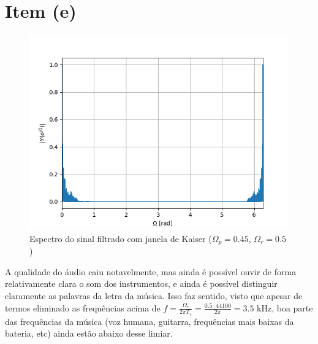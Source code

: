 \documentclass{article}
\begin{document}
\section*{Item (e)}
\FloatBarrier
\begin{figure}[!ht]
    \centering
    \includegraphics[width=\linewidth]{images/filtered_spectrum.png}
    \caption{Espectro do sinal filtrado com janela de Kaiser ($\Omega_p = 0.45$, $\Omega_r = 0.5$)}
\end{figure}

A qualidade do áudio caiu notavelmente, mas ainda é possível ouvir de forma relativamente clara o som dos instrumentos, e ainda é possível distinguir claramente as palavras da letra da música.
Isso faz sentido, visto que apesar de termos eliminado as frequências acima de $f = \frac{\Omega_r}{2\pi T_s} = \frac{0.5 \cdot 44100}{2\pi} = 3.5 \text{ kHz}$, boa parte das frequências da música (voz humana, guitarra, frequências mais baixas da bateria, etc) ainda estão abaixo desse limiar.

\newpage
\end{document}
